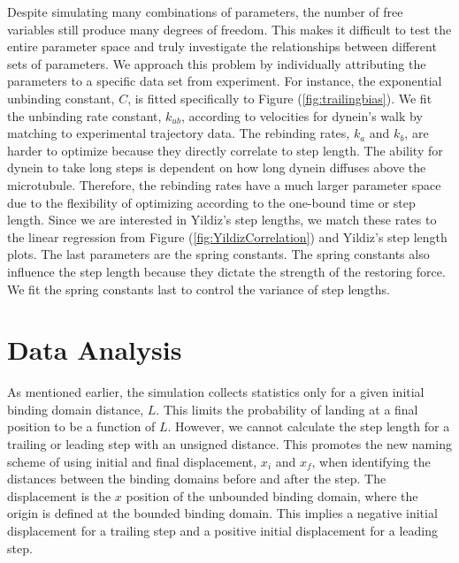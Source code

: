 Despite simulating many combinations of parameters, the number of free variables still produce many degrees of freedom. This makes it difficult to test the entire parameter space and truly investigate the relationships between different sets of parameters. We approach this problem by individually attributing the parameters to a specific data set from experiment. For instance, the exponential unbinding constant, $C$, is fitted specifically to Figure (\ref{fig:trailingbias}). We fit the unbinding rate constant, $k_{ub}$, according to velocities for dynein's walk by matching to experimental trajectory data. The rebinding rates, $k_a$ and $k_b$, are harder to optimize because they directly correlate to step length. The ability for dynein to take long steps is dependent on how long dynein diffuses above the microtubule. Therefore, the rebinding rates have a much larger parameter space due to the flexibility of optimizing according to the one-bound time or step length. Since we are interested in Yildiz's step lengths, we match these rates to the linear regression from Figure (\ref{fig:YildizCorrelation}) and Yildiz's step length plots. The last parameters are the spring constants. The spring constants also influence the step length because they dictate the strength of the restoring force. We fit the spring constants last to control the variance of step lengths.




\section{Data Analysis} \label{sec:DataAna}
As mentioned earlier, the simulation collects statistics only for a given initial binding domain distance, $L$. This limits the probability of landing at a final position to be a function of $L$. However, we cannot calculate the step length for a trailing or leading step with an unsigned distance. This promotes the new naming scheme of using initial and final displacement, $x_i$ and $x_f$, when identifying the distances between the binding domains before and after the step. The displacement is the $x$ position of the unbounded binding domain, where the origin is defined at the bounded binding domain. This implies a negative initial displacement for a trailing step and a positive initial displacement for a leading step. 

